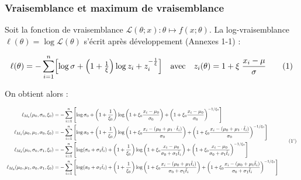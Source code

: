 \documentclass[
  article,
  nofooter,
  noheadings]{jss}
\begin{document}
\subsubsection{Vraisemblance et maximum de
vraisemblance}\label{vraisemblance-et-maximum-de-vraisemblance}

Soit la fonction de vraisemblance
\({\displaystyle {\mathcal {L}}(\theta ;x)} : {\displaystyle \theta \mapsto f(x;\theta )}\).
La log-vraisemblance \(\ell(\theta) = \log \mathcal{L}(\theta)\) s'écrit
après développement (Annexes 1-1) :

\begin{tcolorbox}[enhanced jigsaw, breakable, bottomrule=.15mm, rightrule=.15mm, left=2mm, leftrule=.75mm, opacityback=0, colback=white, arc=.35mm, toprule=.15mm, colframe=quarto-callout-color-frame]

\[
\ell(\theta)=
-\sum_{i=1}^n\Bigl[
\log\sigma
+\Bigl(1+\tfrac1{\xi}\Bigr)\log z_i
+z_i^{-\frac{1}{\xi}}
\Bigr]
\quad \text{avec} \quad  z_i(\theta)=1+\xi\;\frac{x_i-\mu}{\sigma}
\tag{1}
\]

\end{tcolorbox}

On obtient alors :

\[
\scalebox{0.7}{
\(
\begin{aligned}
\ell_{M_0}(\mu_0, \sigma_0, \xi_0) &=
-\sum_{i=1}^n \left[
\log \sigma_0 +
\left(1 + \frac{1}{\xi_0} \right) \log \left(1 + \xi_0 \frac{x_i - \mu_0}{\sigma_0} \right) +
\left(1 + \xi_0 \frac{x_i - \mu_0}{\sigma_0} \right)^{-1/\xi_0}
\right]\\ 
\ell_{M_1}(\mu_0, \mu_1, \sigma_0, \xi_0) &=
-\sum_{i=1}^n \left[
\log \sigma_0 +
\left(1 + \frac{1}{\xi_0} \right) \log \left(1 + \xi_0 \frac{x_i - (\mu_0 + \mu_1 \cdot \tilde{t}_i)}{\sigma_0} \right) +
\left(1 + \xi_0 \frac{x_i - (\mu_0 + \mu_1 \cdot \tilde{t}_i)}{\sigma_0} \right)^{-1/\xi_0}
\right]\\ 
\ell_{M_2}(\mu_0, \sigma_0, \sigma_1, \xi_0) &=
-\sum_{i=1}^n \left[
\log (\sigma_0 + \sigma_1 \tilde{t}_i) +
\left(1 + \frac{1}{\xi_0} \right) \log \left(1 + \xi_0 \frac{x_i - \mu_0}{\sigma_0 + \sigma_1 \tilde{t}_i} \right) +
\left(1 + \xi_0 \frac{x_i - \mu_0}{\sigma_0 + \sigma_1 \tilde{t}_i} \right)^{-1/\xi_0}
\right]\\ 
\ell_{M_3}(\mu_0, \mu_1, \sigma_0, \sigma_1, \xi_0) &=
-\sum_{i=1}^n \left[
\log (\sigma_0 + \sigma_1 \tilde{t}_i) +
\left(1 + \frac{1}{\xi_0} \right) \log \left(1 + \xi_0 \frac{x_i - (\mu_0 + \mu_1 \tilde{t}_i)}{\sigma_0 + \sigma_1 \tilde{t}_i} \right) +
\left(1 + \xi_0 \frac{x_i - (\mu_0 + \mu_1 \tilde{t}_i)}{\sigma_0 + \sigma_1 \tilde{t}_i} \right)^{-1/\xi_0}
\right]
\end{aligned}
\tag{1'}
\)
}
\]
\end{document}
